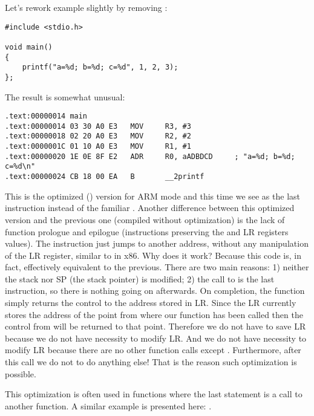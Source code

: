 \label{ARM_B_to_printf}

Let's rework example slightly by removing :

\begin{lstlisting}
#include <stdio.h>

void main()
{
	printf("a=%d; b=%d; c=%d", 1, 2, 3);
};
\end{lstlisting}

The result is somewhat unusual:

\begin{lstlisting}[caption=\OptimizingKeilVI (\ARMMode)]
.text:00000014 main
.text:00000014 03 30 A0 E3   MOV     R3, #3
.text:00000018 02 20 A0 E3   MOV     R2, #2
.text:0000001C 01 10 A0 E3   MOV     R1, #1
.text:00000020 1E 0E 8F E2   ADR     R0, aADBDCD     ; "a=%d; b=%d; c=%d\n"
.text:00000024 CB 18 00 EA   B       __2printf
\end{lstlisting}

This is the optimized (\Othree) version for ARM mode and this time we see  as the last instruction instead of the familiar .
Another difference between this optimized version and the previous one (compiled without optimization)
is the lack of function prologue and epilogue (instructions preserving the  and \ac{LR} registers values).
The  instruction just jumps to another address, without any manipulation of the \ac{LR} register,
similar to \JMP in x86.
Why does it work? Because this code is, in fact, effectively equivalent to the previous.
There are two main reasons: 1) neither the stack nor \ac{SP} (the \gls{stack pointer}) is modified;
2) the call to \printf is the last instruction, so there is nothing going on afterwards.
On completion, the \printf function simply returns the control to the address 
stored in \ac{LR}.
Since the \ac{LR} currently stores the address of the point from where our function
has been called then the control from \printf will be returned to that point.
Therefore we do not have to save \ac{LR} because we do not have necessity to modify \ac{LR}.
And we do not have necessity to modify \ac{LR} because there are no other function calls except \printf. Furthermore,
after this call we do not to do anything else!
That is the reason such optimization is possible.

This optimization is often used in functions where the last statement is a call to another function.
A similar example is presented here:
.

